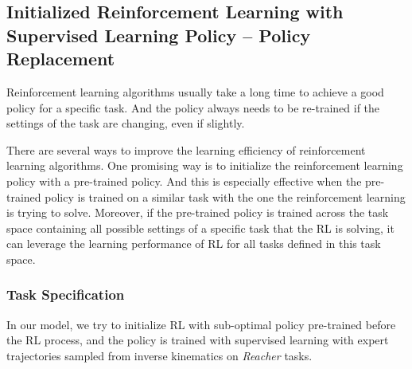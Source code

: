 \documentclass{article}
\begin{document}
\subsection{Initialized Reinforcement Learning with Supervised Learning Policy -- Policy Replacement}
Reinforcement learning algorithms usually take a long time to achieve a good policy for a specific task. And the policy always needs to be re-trained if the settings of the task are changing, even if slightly. 

There are several ways to improve the learning efficiency of reinforcement learning algorithms. One promising way is to initialize the reinforcement learning policy with a pre-trained policy. And this is especially effective when the pre-trained policy is trained on a similar task with the one the reinforcement learning is trying to solve. Moreover, if the pre-trained policy is trained across the task space containing all possible settings of a specific task that the RL is solving, it can leverage the learning performance of RL for all tasks defined in this task space.
\subsubsection{Task Specification}
In our model, we try to initialize RL with sub-optimal policy pre-trained before the RL process, and the policy is trained with supervised learning with expert trajectories sampled from inverse kinematics on \textit{Reacher} tasks. 
\end{document}
